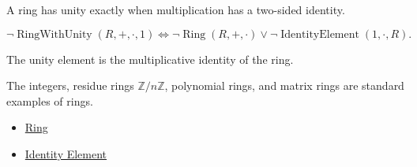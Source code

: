 \begin{remark*}
A ring has unity exactly when multiplication has a two-sided identity.
\end{remark*}

\begin{remark*}
\[
\neg\operatorname{RingWithUnity}(R,+,\cdot,1)
\Longleftrightarrow
\neg\operatorname{Ring}(R,+,\cdot)
\lor
\neg\operatorname{IdentityElement}(1,\cdot,R).
\]
\end{remark*}

\begin{remark*}[Interpretation]
The unity element is the multiplicative identity of the ring.
\end{remark*}

\begin{remark*}[Examples]
The integers, residue rings $\mathbb{Z}/n\mathbb{Z}$, polynomial rings, and
matrix rings are standard examples of rings.
\end{remark*}

\begin{dependencies}
\begin{itemize}
  \item \hyperref[def:algebraic-ring]{Ring}
  \item \hyperref[def:identity-element]{Identity Element}
\end{itemize}
\end{dependencies}
